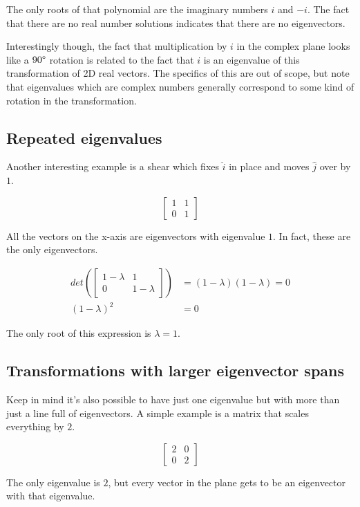 The only roots of that polynomial are the imaginary numbers $i$ and $-i$. The
fact that there are no real number solutions indicates that there are no
eigenvectors.

\begin{remark}
  Interestingly though, the fact that multiplication by $i$ in the complex plane
  looks like a $90 \degree$ rotation is related to the fact that $i$ is an
  eigenvalue of this transformation of 2D real vectors. The specifics of this
  are out of scope, but note that eigenvalues which are complex numbers
  generally correspond to some kind of rotation in the transformation.
\end{remark}

\subsection{Repeated eigenvalues}

Another interesting example is a shear which fixes $\hat{i}$ in place and moves
$\hat{j}$ over by $1$.

\begin{equation*}
  \begin{bmatrix}
    1 & 1 \\
    0 & 1
  \end{bmatrix}
\end{equation*}

All the vectors on the x-axis are eigenvectors with eigenvalue $1$. In fact,
these are the only eigenvectors.

\begin{align*}
  det\left(\begin{bmatrix}
    1 - \lambda & 1 \\
    0 & 1 - \lambda
  \end{bmatrix}\right) &= (1 - \lambda)(1 - \lambda) = 0 \\
  (1 - \lambda)^2 &= 0
\end{align*}

The only root of this expression is $\lambda = 1$.

\subsection{Transformations with larger eigenvector spans}

Keep in mind it's also possible to have just one eigenvalue but with more than
just a line full of eigenvectors. A simple example is a matrix that scales
everything by $2$.

\begin{equation*}
  \begin{bmatrix}
    2 & 0 \\
    0 & 2
  \end{bmatrix}
\end{equation*}

The only eigenvalue is $2$, but every vector in the plane gets to be an
eigenvector with that eigenvalue.
